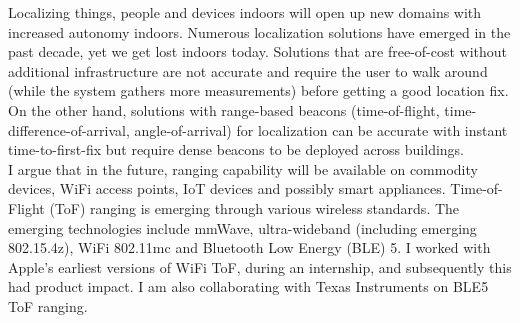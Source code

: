 \documentclass[10pt]{article}
\begin{document}
Localizing things, people and devices indoors will open up new domains with increased autonomy indoors. 
Numerous localization solutions have emerged in the past decade, yet we get lost indoors today. 
Solutions that are free-of-cost without additional infrastructure are not accurate and require the user to walk around (while the system gathers more measurements) before getting a good location fix. %
On the other hand, solutions with range-based beacons (time-of-flight, time-difference-of-arrival, angle-of-arrival) for localization can be accurate with instant time-to-first-fix but require dense beacons to be deployed across buildings.\\

I argue that in the future, ranging capability will be available on commodity devices, WiFi access points, IoT devices and possibly smart appliances. 
Time-of-Flight (ToF) ranging is emerging through various wireless standards. The emerging technologies include mmWave, ultra-wideband (including emerging 802.15.4z), WiFi 802.11mc and Bluetooth Low Energy (BLE) 5.  I worked with Apple's earliest versions of WiFi ToF, during an internship, and subsequently this had product impact. I am also collaborating with Texas Instruments on BLE5 ToF ranging. \\
\end{document}
